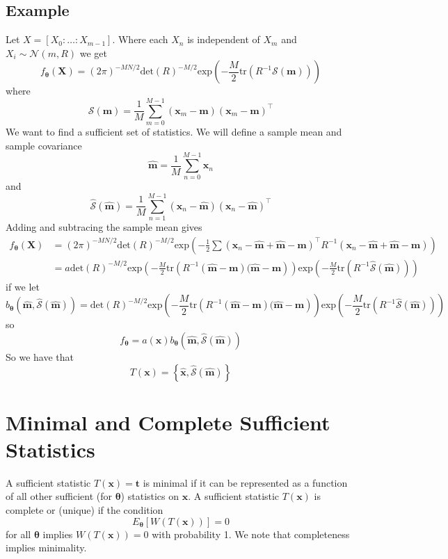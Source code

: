 \documentclass[a4paper]{article}
\begin{document}
\subsection*{Example}%
Let $X = [X_0: \dots: X_{m-1}]$. Where each $X_n$ is independent of $X_m$ and $X_i \sim \mathcal{N}(m, R)$
we get
\[
  f_{\bm{\theta}}(\mathbf{X}) = 
  (2\pi)^{-MN/2} \text{det}(R)^{-M/2} \text{exp} \left( -\frac{M}{2} \text{tr} \left( R^{-1} \mathcal{S}(\mathbf{m}) \right)\right)
\]
where 
\[
  \mathcal{S}(\mathbf{m}) = \frac{1}{M} \sum_{m=0}^{M-1} (\mathbf{x}_m  - \mathbf{m})(\mathbf{x}_m - \mathbf{m})^\top
\]
We want to find a sufficient set of statistics. We will define a sample mean and sample covariance
\[
  \hat{\bm{m}} = \frac{1}{M}\sum_{n=0}^{M-1} \bm{x}_n
\]
and 
\[
  \hat{\mathcal{S}}(\hat{\bm{m}}) = \frac{1}{M}  \sum_{n=1}^{M-1} (\bm{x}_n - \hat{\bm{m}})(\bm{x}_n - \hat{\bm{m}})^\top
\]
Adding and subtracing the sample mean gives 
\[
  \begin{aligned}
    f_{\bm{\theta}}(\mathbf{X}) &= 
  (2\pi)^{-MN/2} \text{det}(R)^{-M/2} \text{exp} \left( -\frac{1}{2} \sum (\bm{x}_n - \hat{\bm{m}} + \hat{\bm{m}} - \bm{m})^\top R^{-1}(\bm{x}_n - \hat{\bm{m}} + \hat{\bm{m}} - \bm{m})\right) \\
                                &=  a\text{det}(R)^{-M/2} \text{exp} \left( -\frac{M}{2} \text{tr} \left( R^{-1}(\hat{\bm{m}} - \bm{m})(\hat{\bm{m}} - \bm{m}\right) \right) \text{exp} \left( -\frac{M}{2} \text{tr} \left( R^{-1}\hat{\mathcal{S}}(\hat{\bm{m}}) \right) \right)
  \end{aligned}
\]
if we let 
\[
  b_{\bm{\theta}}(\hat{\bm{m}}, \hat{\mathcal{S}}(\hat{\bm{m}})) = \text{det}(R)^{-M/2} \text{exp} \left( -\frac{M}{2} \text{tr} \left( R^{-1}(\hat{\bm{m}} - \bm{m})(\hat{\bm{m}} - \bm{m}\right) \right) \text{exp} \left( -\frac{M}{2} \text{tr} \left( R^{-1}\hat{\mathcal{S}}(\hat{\bm{m}}) \right) \right)
\]
so
\[
  f_{\bm{\theta}} = a(\bm{x})  b_{\bm{\theta}}(\hat{\bm{m}}, \hat{\mathcal{S}}(\hat{\bm{m}})) 
\]
So we have that
\[
  T(\bm{x}) = \left\{ \hat{\bm{x}}, \hat{\mathcal{S}}(\hat{\bm{m}}) \right\}
\]

\section*{Minimal and Complete Sufficient Statistics}%
A sufficient statistic $T(\mathbf{x}) = \bm{t}$ is minimal if it can be represented as a function of all other sufficient (for $\bm{\theta}$) statistics on $\bm{x}$. A sufficient statistic $T(\mathbf{x})$ is complete or (unique) if the condition
\[
  E_{\bm{\theta}} \left[ W(T(\mathbf{x})) \right] = 0
\]
for all $\bm{\theta}$ implies $W(T(\bm{x})) = 0$ with probability 1. We note that completeness implies minimality.
\end{document}
